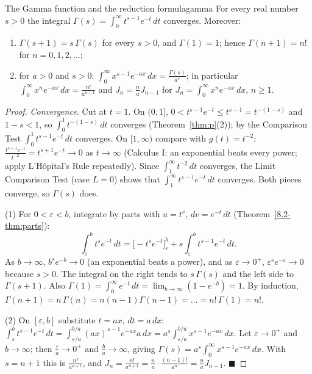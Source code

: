 \documentclass[11pt]{article}
\begin{document}
\begin{thm}{The Gamma function and the reduction formula}{gamma}
For every real number $s>0$ the integral $\Gamma(s)=\displaystyle\int_0^\infty t^{s-1}e^{-t}\,dt$ converges. Moreover:
\begin{enumerate}[label=(\arabic*),leftmargin=*]
  \item $\Gamma(s+1)=s\,\Gamma(s)$ for every $s>0$, and $\Gamma(1)=1$; hence $\Gamma(n+1)=n!$ for $n=0,1,2,\dots$;
  \item for $a>0$ and $s>0$: $\displaystyle\int_0^\infty x^{s-1}e^{-ax}\,dx=\frac{\Gamma(s)}{a^s}$; in particular $\displaystyle\int_0^\infty x^ne^{-ax}\,dx=\frac{n!}{a^{n+1}}$ and $J_n=\frac naJ_{n-1}$ for $J_n=\int_0^\infty x^ne^{-ax}\,dx$, $n\ge1$.
\end{enumerate}
\end{thm}
\begin{proof}
\emph{Convergence.} Cut at $t=1$. On $(0,1]$, $0<t^{s-1}e^{-t}\le t^{s-1}=t^{-(1-s)}$ and $1-s<1$, so $\int_0^1t^{-(1-s)}\,dt$ converges (Theorem~\ref{thm:p}(2)); by the Comparison Test $\int_0^1t^{s-1}e^{-t}\,dt$ converges. On $[1,\infty)$ compare with $g(t)=t^{-2}$: $\frac{t^{s-1}e^{-t}}{t^{-2}}=t^{s+1}e^{-t}\to0$ as $t\to\infty$ (Calculus I: an exponential beats every power; apply L'Hôpital's Rule repeatedly). Since $\int_1^\infty t^{-2}\,dt$ converges, the Limit Comparison Test (case $L=0$) shows that $\int_1^\infty t^{s-1}e^{-t}\,dt$ converges. Both pieces converge, so $\Gamma(s)$ does.

(1) For $0<\varepsilon<b$, integrate by parts with $u=t^s$, $dv=e^{-t}\,dt$ (Theorem~\ref{8.2-thm:parts}):
\[\int_\varepsilon^bt^se^{-t}\,dt=\Big[-t^se^{-t}\Big]_\varepsilon^b+s\int_\varepsilon^bt^{s-1}e^{-t}\,dt .\]
As $b\to\infty$, $b^se^{-b}\to0$ (an exponential beats a power), and as $\varepsilon\to0^+$, $\varepsilon^se^{-\varepsilon}\to0$ because $s>0$. The integral on the right tends to $s\,\Gamma(s)$ and the left side to $\Gamma(s+1)$. Also $\Gamma(1)=\int_0^\infty e^{-t}\,dt=\lim_{b\to\infty}(1-e^{-b})=1$. By induction, $\Gamma(n+1)=n\,\Gamma(n)=n(n-1)\Gamma(n-1)=\dots=n!\,\Gamma(1)=n!$.

(2) On $[\varepsilon,b]$ substitute $t=ax$, $dt=a\,dx$: $\int_\varepsilon^bt^{s-1}e^{-t}\,dt=\int_{\varepsilon/a}^{b/a}(ax)^{s-1}e^{-ax}a\,dx=a^s\int_{\varepsilon/a}^{b/a}x^{s-1}e^{-ax}\,dx$. Let $\varepsilon\to0^+$ and $b\to\infty$; then $\frac\varepsilon a\to0^+$ and $\frac ba\to\infty$, giving $\Gamma(s)=a^s\int_0^\infty x^{s-1}e^{-ax}\,dx$. With $s=n+1$ this is $\frac{n!}{a^{n+1}}$, and $J_n=\frac{n!}{a^{n+1}}=\frac na\cdot\frac{(n-1)!}{a^n}=\frac naJ_{n-1}$. $\blacksquare$
\end{proof}
\end{document}
